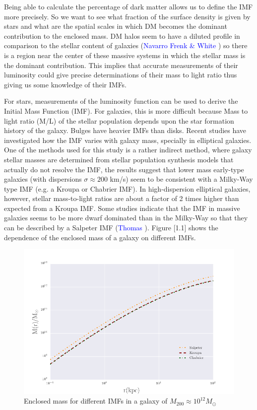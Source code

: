 Being able to calculate the percentage of dark matter allows us to define the IMF more precisely. So we want to see what fraction of the surface density is given by stars and what are the spatial scales in which DM becomes the dominant contribution to the enclosed mass. DM halos seem to have a diluted profile in comparison to the stellar content of galaxies (\textcolor{blue}{Navarro Frenk \& White} \citeyear{Reference17}) so there is a region near the center of these massive systems in which the stellar mass is the dominant contribution. This implies that accurate measurements of their luminosity could give precise determinations of their mass to light ratio thus giving us some knowledge of their IMFs.

For stars, measurements of the luminosity function can be used to derive the Initial Mass Function (IMF). For galaxies, this is more difficult because Mass to light ratio (M/L) of the stellar population depends upon the star formation history of the galaxy. Bulges have heavier IMFs than disks. Recent studies have investigated how the IMF varies with galaxy mass, specially in elliptical galaxies. One of the methods used for this study is a rather indirect method, where galaxy stellar masses are determined from stellar population synthesis models that actually do not resolve the IMF, the results suggest that lower mass early-type galaxies (with dispersions $\sigma \approx 200$ km/s) seem to be consistent with a Milky-Way type IMF (e.g. a Kroupa or Chabrier IMF). In high-dispersion elliptical galaxies, however, stellar mass-to-light ratios are about a factor of 2 times higher than expected from a Kroupa IMF. Some studies indicate that the IMF in massive galaxies seems to be more dwarf dominated than in the Milky-Way so that they can be described by a Salpeter IMF (\textcolor{blue}{Thomas} \citeyear{Reference28}). Figure [1.1] shows the dependence of the enclosed mass of a galaxy on different IMFs.

\begin{figure}[H]
\centering
\includegraphics[width=12cm]{images/Enclosed_Mass_IMFs.png}
\caption[Enclosed mass for different IMFs in a galaxy]{Enclosed mass for different IMFs in a galaxy of $M_{200}\approx 10^{12} M_{\odot}$}
\end{figure}   

